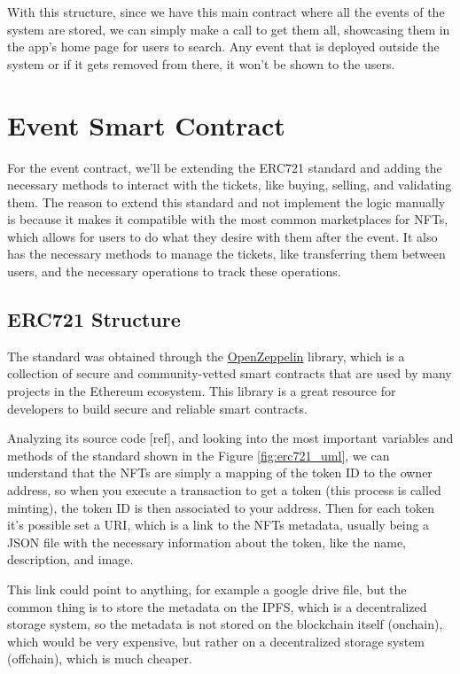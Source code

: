 With this structure, since we have this main contract where all the events of the system are stored, we can simply make a call to get them all, showcasing them in the app's home page for users to search. Any event that is deployed outside the system or if it gets removed from there, it won't be shown to the users.

\section{Event Smart Contract}
\label{sec:event_smart_contract}

For the event contract, we'll be extending the ERC721 standard and adding the necessary methods to interact with the tickets, like buying, selling, and validating them. The reason to extend this standard and not implement the logic manually is because it makes it compatible with the most common marketplaces for NFTs, which allows for users to do what they desire with them after the event. It also has the necessary methods to manage the tickets, like transferring them between users, and the necessary operations to track these operations.

\subsection{ERC721 Structure}
\label{subsec:erc721_structure}

The standard was obtained through the \href{https://docs.openzeppelin.com/contracts/api/token/erc721#ERC721}{OpenZeppelin} library, which is a collection of secure and community-vetted smart contracts that are used by many projects in the Ethereum ecosystem. This library is a great resource for developers to build secure and reliable smart contracts.

Analyzing its source code [ref], and looking into the most important variables and methods of the standard shown in the Figure \ref{fig:erc721_uml}, we can understand that the NFTs are simply a mapping of the token ID to the owner address, so when you execute a transaction to get a token (this process is called minting), the token ID is then associated to your address. Then for each token it's possible set a URI, which is a link to the NFTs metadata, usually being a JSON file with the necessary information about the token, like the name, description, and image.

This link could point to anything, for example a google drive file, but the common thing is to store the metadata on the IPFS, which is a decentralized storage system, so the metadata is not stored on the blockchain itself (onchain), which would be very expensive, but rather on a decentralized storage system (offchain), which is much cheaper.

